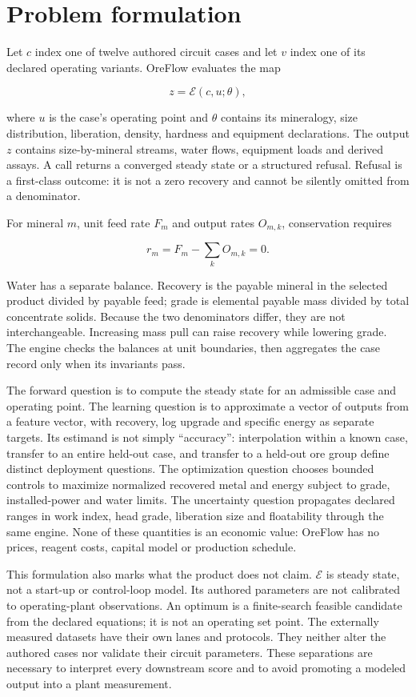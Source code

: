 \documentclass[10pt]{article}
\begin{document}
\section{Problem formulation}\label{problem-formulation}

Let \(c\) index one of twelve authored circuit cases and let \(v\) index
one of its declared operating variants. OreFlow evaluates the map

\[z=\mathcal{E}(c,u;\theta),\]

where \(u\) is the case's operating point and \(\theta\) contains its
mineralogy, size distribution, liberation, density, hardness and
equipment declarations. The output \(z\) contains size-by-mineral
streams, water flows, equipment loads and derived assays. A call returns
a converged steady state or a structured refusal. Refusal is a
first-class outcome: it is not a zero recovery and cannot be silently
omitted from a denominator.

For mineral \(m\), unit feed rate \(F_m\) and output rates \(O_{m,k}\),
conservation requires

\[r_m=F_m-\sum_k O_{m,k}=0.\]

Water has a separate balance. Recovery is the payable mineral in the
selected product divided by payable feed; grade is elemental payable
mass divided by total concentrate solids. Because the two denominators
differ, they are not interchangeable. Increasing mass pull can raise
recovery while lowering grade. The engine checks the balances at unit
boundaries, then aggregates the case record only when its invariants
pass.

The forward question is to compute the steady state for an admissible
case and operating point. The learning question is to approximate a
vector of outputs from a feature vector, with recovery, log upgrade and
specific energy as separate targets. Its estimand is not simply
``accuracy'': interpolation within a known case, transfer to an entire
held-out case, and transfer to a held-out ore group define distinct
deployment questions. The optimization question chooses bounded controls
to maximize normalized recovered metal and energy subject to grade,
installed-power and water limits. The uncertainty question propagates
declared ranges in work index, head grade, liberation size and
floatability through the same engine. None of these quantities is an
economic value: OreFlow has no prices, reagent costs, capital model or
production schedule.

This formulation also marks what the product does not claim.
\(\mathcal{E}\) is steady state, not a start-up or control-loop model.
Its authored parameters are not calibrated to operating-plant
observations. An optimum is a finite-search feasible candidate from the
declared equations; it is not an operating set point. The externally
measured datasets have their own lanes and protocols. They neither alter
the authored cases nor validate their circuit parameters. These
separations are necessary to interpret every downstream score and to
avoid promoting a modeled output into a plant measurement.
\end{document}
